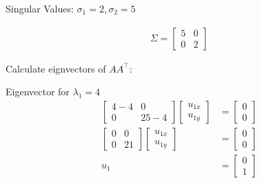 \documentclass[11pt,letterpaper]{article}
\begin{document}
\begin{enumerate}
Singular Values: \( \sigma_1 = 2, \sigma_2 = 5 \)

\begin{align*}
\Sigma = {\begin{bmatrix}
        5 & 0 \\
        0 & 2
    \end{bmatrix}}
\end{align*}

Calculate eignvectors of \( AA^\top \):

Eigenvector for \( \lambda_1 = 4 \)
\begin{align*}
    \begin{bmatrix}
        4-4 & 0 \\
        0 & 25-4
    \end{bmatrix}
    \begin{bmatrix}
        u_{1x} \\ u_{1y}
    \end{bmatrix}
    &= \begin{bmatrix}
        0 \\ 0
    \end{bmatrix} \\
    \begin{bmatrix}
        0 & 0 \\
        0 & 21
    \end{bmatrix}
    \begin{bmatrix}
        u_{1x} \\ u_{1y}
    \end{bmatrix}
    &= \begin{bmatrix}
        0 \\ 0
    \end{bmatrix} \\
    u_1
    &= \begin{bmatrix}
        0 \\ 1
    \end{bmatrix}
\end{align*}


\end{enumerate}
\end{document}
